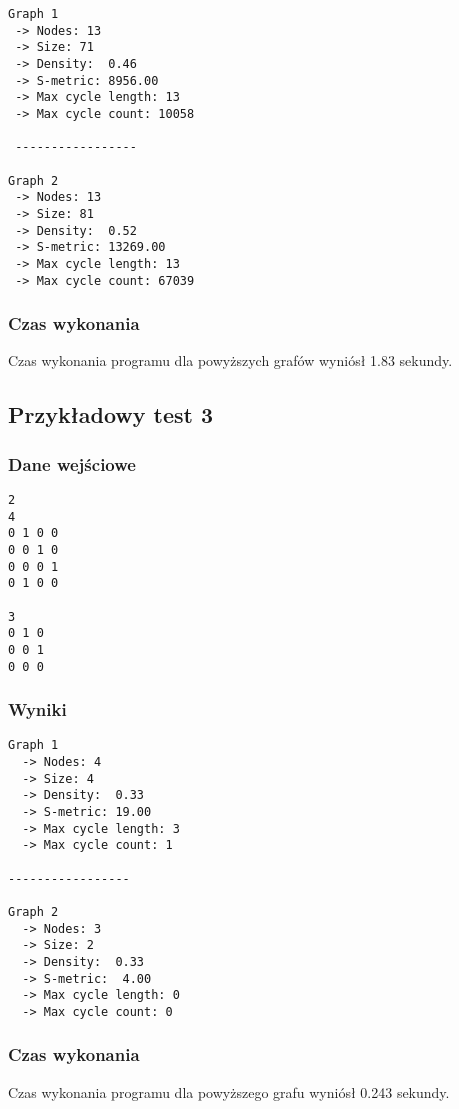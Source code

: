 \documentclass[a4paper, 12pt]{article}
\begin{document}
\begin{verbatim}
Graph 1
 -> Nodes: 13
 -> Size: 71
 -> Density:  0.46
 -> S-metric: 8956.00
 -> Max cycle length: 13
 -> Max cycle count: 10058

 ----------------- 

Graph 2
 -> Nodes: 13
 -> Size: 81
 -> Density:  0.52
 -> S-metric: 13269.00
 -> Max cycle length: 13
 -> Max cycle count: 67039
 \end{verbatim}

\subsubsection*{Czas wykonania}

Czas wykonania programu dla powyższych grafów wyniósł 1.83 sekundy.

\subsection{Przykładowy test 3}

\subsubsection*{Dane wejściowe}

\begin{verbatim}
2
4
0 1 0 0
0 0 1 0
0 0 0 1
0 1 0 0

3
0 1 0
0 0 1
0 0 0
\end{verbatim}

\subsubsection*{Wyniki}

\begin{verbatim}
Graph 1
  -> Nodes: 4
  -> Size: 4
  -> Density:  0.33
  -> S-metric: 19.00
  -> Max cycle length: 3
  -> Max cycle count: 1
   
----------------- 
   
Graph 2
  -> Nodes: 3
  -> Size: 2
  -> Density:  0.33
  -> S-metric:  4.00
  -> Max cycle length: 0
  -> Max cycle count: 0
\end{verbatim}

\subsubsection*{Czas wykonania}

Czas wykonania programu dla powyższego grafu wyniósł 0.243 sekundy.
\end{document}
